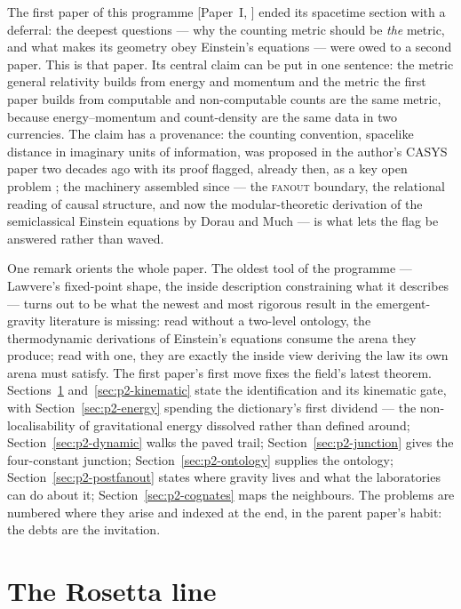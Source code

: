 \documentclass[11pt,a4paper]{article}
\newcommand{\Pone}[1]{[Paper~I, #1]} %
\newcommand{\fanout}{\textsc{fanout}}
\begin{document}
The first paper of this programme \Pone{} ended its spacetime section with a deferral: the deepest
questions --- why the counting metric should be \emph{the} metric, and what makes its geometry
obey Einstein's equations --- were owed to a second paper. This is that paper. Its central claim
can be put in one sentence: the metric general relativity builds from energy and momentum and the
metric the first paper builds from computable and non-computable counts are the same metric,
because energy--momentum and count-density are the same data in two currencies. The claim has a
provenance: the counting convention, spacelike distance in imaginary units of information, was
proposed in the author's CASYS paper two decades ago with its proof flagged, already then, as a
key open problem \autocite{small_2006}; the machinery assembled since --- the \fanout{} boundary,
the relational reading of causal structure, and now the modular-theoretic derivation of the
semiclassical Einstein equations by Dorau and Much \autocite{doraumuch2026relative} --- is what
lets the flag be answered rather than waved.

One remark orients the whole paper. The oldest tool of the programme --- Lawvere's fixed-point
shape, the inside description constraining what it describes --- turns out to be what the newest
and most rigorous result in the emergent-gravity literature is missing: read without a two-level
ontology, the thermodynamic derivations of Einstein's equations consume the arena they produce;
read with one, they are exactly the inside view deriving the law its own arena must satisfy. The
first paper's first move fixes the field's latest theorem. Sections~\ref{sec:p2-rosetta}
and~\ref{sec:p2-kinematic} state the identification and its kinematic gate, with
Section~\ref{sec:p2-energy} spending the dictionary's first dividend --- the non-localisability
of gravitational energy dissolved rather than defined around;
Section~\ref{sec:p2-dynamic} walks the paved trail; Section~\ref{sec:p2-junction} gives the
four-constant junction; Section~\ref{sec:p2-ontology} supplies the ontology;
Section~\ref{sec:p2-postfanout} states where gravity lives and what the laboratories can do about
it; Section~\ref{sec:p2-cognates} maps the neighbours. The problems are numbered where they arise
and indexed at the end, in the parent paper's habit: the debts are the invitation.

\section{The Rosetta line}
\label{sec:p2-rosetta}
\end{document}
